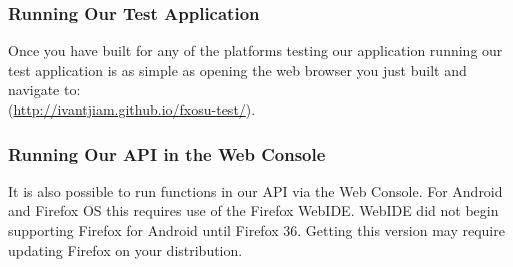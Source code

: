 \documentclass[12pt]{article}
\begin{document}
\subsubsection{Running Our Test Application}
Once you have built for any of the platforms testing our application running our test application is as simple as opening the  web browser you just built and navigate to: \\ (\href{http://ivantjiam.github.io/fxosu-test/}{http://ivantjiam.github.io/fxosu-test/}). 
\subsubsection{Running Our API in the Web Console}
It is also possible to run functions in our API via the Web Console.  For Android and Firefox OS this requires use of the Firefox WebIDE. WebIDE did not begin supporting Firefox for Android until Firefox 36.  Getting this version may require updating Firefox on your distribution.  
\end{document}
